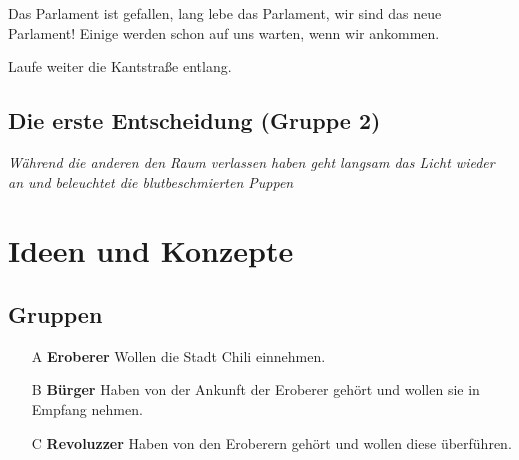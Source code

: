 \documentclass[a4paper, 12pt]{article}
\begin{document}
Das Parlament ist gefallen, lang lebe das Parlament, wir sind das neue Parlament!
Einige werden schon auf uns warten, wenn wir ankommen.

Laufe weiter die Kantstraße entlang. 




\subsection{Die erste Entscheidung (Gruppe 2)}
\textit{Während die anderen den Raum verlassen haben geht langsam das Licht wieder an und beleuchtet die blutbeschmierten Puppen}

\section{Ideen und Konzepte}\label{ideen_konzepte}
\subsection{Gruppen}
\begin{itemize}
    \item[A] \textbf{Eroberer} Wollen die Stadt Chili einnehmen.
    \item[B] \textbf{Bürger} Haben von der Ankunft der Eroberer gehört und wollen sie in Empfang nehmen.
    \item[C] \textbf{Revoluzzer} Haben von den Eroberern gehört und wollen diese überführen.
\end{itemize}
\end{document}
